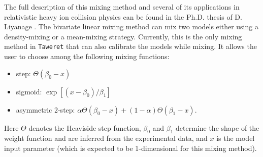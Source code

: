 \documentclass[10pt, preprint,aps,prc,floatfix,
tightenlines,
nofootinbib,superscriptaddress]{revtex4-2}
\begin{document}
The full description of this mixing method and several of its applications in relativistic heavy ion collision physics can be found in the Ph.D. thesis of D. Liyanage \cite{Liyanage_thesis}. The bivariate linear mixing method can mix two models either using a density-mixing or a mean-mixing strategy. Currently, this is the only mixing method in \texttt{Taweret} that can also calibrate the models while mixing. It allows the user to choose among the following mixing functions:
\begin{itemize}[nosep]
    \item step: $\Theta(\beta_0-x)$
    \item sigmoid: $\exp\left[(x-\beta_0)/\beta_1\right]$
    \item asymmetric 2-step: $\alpha \Theta(\beta_0-x) + (1-\alpha)\Theta(\beta_1-x)$.
\end{itemize}
Here $\Theta$ denotes the Heaviside step function, $\beta_0$ and $\beta_1$ determine the shape of the weight function and are inferred from the experimental data, and  $x$ is the model input parameter (which is expected to be 1-dimensional for this mixing method).

\end{document}
